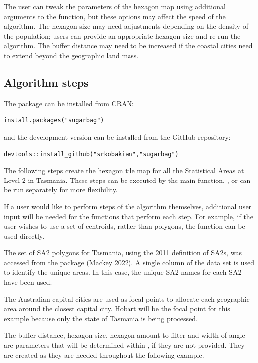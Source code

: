 The user can tweak the parameters of the hexagon map using additional arguments to the  function, but these options may affect the speed of the algorithm.
The hexagon size may need adjustments depending on the density of the population; users can provide an appropriate hexagon size and re-run the algorithm. The buffer distance may need to be increased if the coastal cities need to extend beyond the geographic land mass.

\hypertarget{algorithm-steps}{%
\subsection{Algorithm steps}\label{algorithm-steps}}

The package can be installed from CRAN:

\begin{verbatim}
install.packages("sugarbag")
\end{verbatim}

\noindent and the development version can be installed from the GitHub repository:

\begin{verbatim}
devtools::install_github("srkobakian","sugarbag")
\end{verbatim}

The following steps create the hexagon tile map for all the Statistical Areas at Level 2 in Tasmania. These steps can be executed by the main function, , or can be run separately for more flexibility.

If a user would like to perform steps of the algorithm themselves, additional user input will be needed for the functions that perform each step. For example, if the user wishes to use a set of centroids, rather than polygons, the  function can be used directly.

The set of SA2 polygons for Tasmania, using the 2011 definition of SA2s, was accessed from the  package (Mackey 2022). A single column of the data set is used to identify the unique areas. In this case, the unique SA2 names for each SA2 have been used.

The Australian capital cities are used as focal points to allocate each geographic area around the closest capital city. Hobart will be the focal point for this example because only the state of Tasmania is being processed.

The buffer distance, hexagon size, hexagon amount to filter and width of angle are parameters that will be determined within , if they are not provided. They are created as they are needed throughout the following example.

